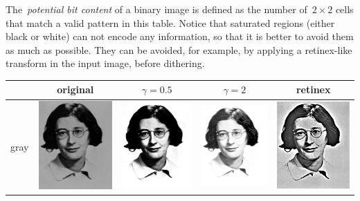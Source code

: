 The~\emph{potential bit content} of a binary image is defined as the number
of~$2\times2$ cells that match a valid pattern in this table.
Notice that saturated regions (either black or white) can not encode any
information, so that it is better to avoid them as much as possible.
They can be avoided, for example, by applying a retinex-like transform in the
input image, before dithering.

\begin{tabular}{l|cccc}
	&
	original &
	$\gamma=0.5$ &
	$\gamma=2$ &
	retinex \\
	\hline
	gray &
	\includegraphics{i/psimone.png} &
	\includegraphics{psimone-gam.png} &
	\includegraphics{psimone-ugam.png} &
	\includegraphics{psimone-ret.png} \\

\end{tabular}
